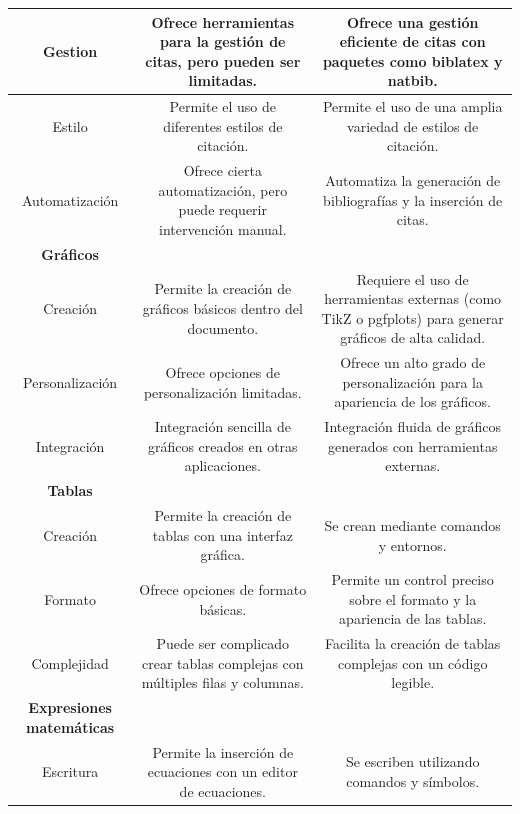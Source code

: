\documentclass[10pt]{article}
\begin{document}
\begin{table}[h!]
{\begin{tabular}{|c|c|c|}
            {Gestion}         & Ofrece herramientas para la gestión de citas, pero pueden ser limitadas.          & Ofrece una gestión eficiente de citas con paquetes como biblatex y natbib.                 \\ \hline
            {Estilo}          & Permite el uso de diferentes estilos de citación.          & Permite el uso de una amplia variedad de estilos de citación.\\ \hline
            {Automatización}  & Ofrece cierta automatización, pero puede requerir intervención manual.          & Automatiza la generación de bibliografías y la inserción de citas.                \\ \hline
            \textbf{Gráficos}        &         &                   \\ \hline
            {Creación}        & Permite la creación de gráficos básicos dentro del documento.          & Requiere el uso de herramientas externas (como TikZ o pgfplots) para generar gráficos de alta calidad.                \\ \hline
            {Personalización} & Ofrece opciones de personalización limitadas.          & Ofrece un alto grado de personalización para la apariencia de los gráficos.\\ \hline
            {Integración}     & Integración sencilla de gráficos creados en otras aplicaciones.          & Integración fluida de gráficos generados con herramientas externas.              \\ \hline
            \textbf{Tablas}          &         &                   \\ \hline
            {Creación}        & Permite la creación de tablas con una interfaz gráfica.        & Se crean mediante comandos y entornos.                \\ \hline
            {Formato}         & Ofrece opciones de formato básicas.          & Permite un control preciso sobre el formato y la apariencia de las tablas.\\ \hline
            {Complejidad}     & Puede ser complicado crear tablas complejas con múltiples filas y columnas.          & Facilita la creación de tablas complejas con un código legible.              \\ \hline
            \textbf{Expresiones matemáticas}          &         &                   \\ \hline
            {Escritura}        & Permite la inserción de ecuaciones con un editor de ecuaciones.        & Se escriben utilizando comandos y símbolos.                \\ \hline

\end{tabular}}
\end{table}
\end{document}
